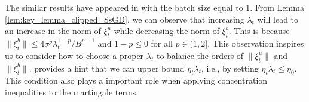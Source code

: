 \documentclass{article}
\begin{document}
The similar results have appeared in \citep{zhang_2020,gorbunov_2020,zhang_2023,Nguyen_2023,liu_2023c, liu_2023stochasticnonsmoothconvexoptimization,liuzijian_2023,LiuLangqi_2024} with the batch size equal to 1. From Lemma \ref{lem:key_lemma_clipped_SsGD}, we can observe that increasing $\lambda_t$ will lead to an increase in the norm of $\xi_t^u$ while decreasing the norm of $\xi_t^b$. This is because $\|\xi_t^b\| \leq 4\sigma^p\lambda_t^{1-p}/B^{p-1}$ and $1-p \leq 0$ for all $p \in (1, 2]$. This observation inspires us to consider how to choose a proper $\lambda_t$ to balance the orders of $\|\xi_t^u\|$ and $\|\xi_t^b\|$. \citep{liu_2023stochasticnonsmoothconvexoptimization} provides a hint that we can upper bound $\eta_t\lambda_t$, i.e., by setting $\eta_t\lambda_t \leq \eta_0$. This condition also plays a important role when applying concentration inequalities to the martingale terms.
\end{document}
